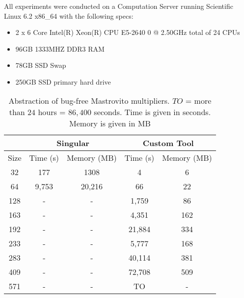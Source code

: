 All experiments were
conducted on a Computation Server running Scientific Linux 6.2 x86\_64 
with the following specs:
\begin{itemize}
\item 2 x 6 Core Intel(R) Xeon(R) CPU E5-2640 0 @ 2.50GHz total of 24 CPUs
\item 96GB 1333MHZ DDR3 RAM
\item 78GB SSD Swap
\item 250GB SSD primary hard drive
\end{itemize}



\begin{table}[H]
\begin{center}
\caption{Abstraction of bug-free Mastrovito multipliers. $TO$ = more than $24$ hours = $86,400$ seconds. Time is given in seconds. Memory is given in MB}
\label{tab:absmasresults}
\begin{tabular}{|c||c|c||c|c|} 
\hline

& \multicolumn{2}{c||}{Singular} & \multicolumn{2}{c|}{Custom Tool} \\
	\hline

Size    & Time (s)   & Memory (MB)& Time (s)   & Memory (MB)\\
\hline
32       & 177   & 1308 & 4   & 6\\
\hline
64      & 9,753   & 20,216 &66   & 22\\
\hline
128      & - & - & 1,759 & 86\\
\hline
163      & - &  - & 4,351 &  162\\
\hline
192      & -     &   -   & 21,884 &  334\\
\hline
233      & -     &   -   &5,777 &  168\\
\hline
283      & -     &   -   &40,114 &  381\\
\hline
409      & -     &   -   &72,708 &  509\\
\hline
571      & -     &   -   &TO & -  \\
\hline

\end{tabular}
\end{center}
\end{table}



